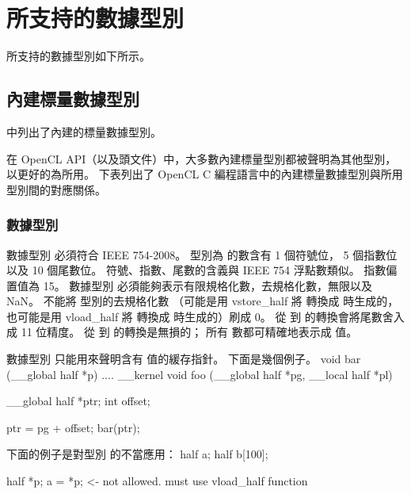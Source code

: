 \section{所支持的數據型別}

所支持的數據型別如下所示。

\subsection[sec:bisdt]{內建標量數據型別}

中列出了內建的標量數據型別。


在 OpenCL API（以及頭文件）中，大多數內建標量型別都被聲明為其他型別，
以更好的為所用。
下表列出了 OpenCL C 編程語言中的內建標量數據型別與所用型別間的對應關係。



\subsubsection{數據型別 }

數據型別  必須符合 IEEE 754-2008。
型別為  的數含有 1 個符號位， 5 個指數位以及 10 個尾數位。
符號、指數、尾數的含義與 IEEE 754 浮點數類似。
指數偏置值為 15。
數據型別  必須能夠表示有限規格化數，去規格化數，無限以及 NaN。
不能將  型別的去規格化數
（可能是用 vstore_half 將  轉換成  時生成的，
也可能是用 vload_half 將  轉換成  時生成的）刷成 0。
從  到  的轉換會將尾數舍入成 11 位精度。
從   到  的轉換是無損的；
所有  數都可精確地表示成  值。

數據型別  只能用來聲明含有  值的緩存指針。
下面是幾個例子。
\startclc
void bar (__global half *p)
{
	....
}
__kernel void foo (__global half *pg, __local half *pl)
{
	__global half *ptr;
	int offset;

	ptr = pg + offset;
	bar(ptr);
}
\stopclc

下面的例子是對型別  的不當應用：
\startclc
half a;
half b[100];

half *p;
a = *p;		<- not allowed. must use vload_half function
\stopclc

